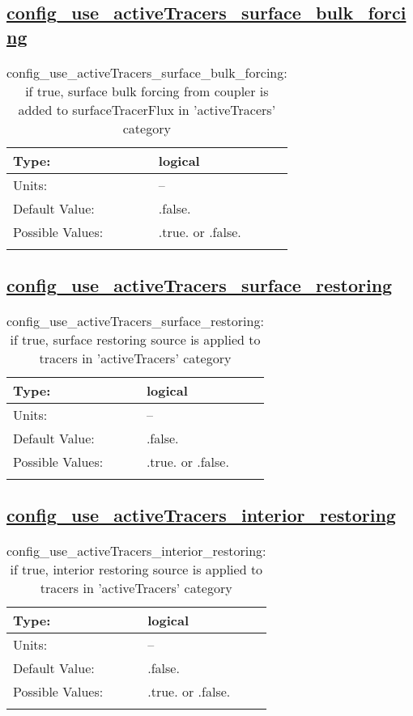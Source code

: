 \subsection[config\_use\_activeTracers\_surface\_bulk\_forcing]{\hyperref[sec:nm_tab_tracer_forcing_activeTracers]{config\_use\_activeTracers\_surface\_bulk\_forcing}}
\label{subsec:nm_sec_config_use_activeTracers_surface_bulk_forcing}
\begin{center}
\begin{longtable}{| p{2.0in} || p{4.0in} |}
    \hline
    Type: & logical \\
    \hline
    Units: & -- \\
    \hline
    Default Value: & .false. \\
    \hline
    Possible Values: & .true. or .false. \\
    \hline
    \caption{config\_use\_activeTracers\_surface\_bulk\_forcing: if true, surface bulk forcing from coupler is added to surfaceTracerFlux in 'activeTracers' category}
\end{longtable}
\end{center}
\subsection[config\_use\_activeTracers\_surface\_restoring]{\hyperref[sec:nm_tab_tracer_forcing_activeTracers]{config\_use\_activeTracers\_surface\_restoring}}
\label{subsec:nm_sec_config_use_activeTracers_surface_restoring}
\begin{center}
\begin{longtable}{| p{2.0in} || p{4.0in} |}
    \hline
    Type: & logical \\
    \hline
    Units: & -- \\
    \hline
    Default Value: & .false. \\
    \hline
    Possible Values: & .true. or .false. \\
    \hline
    \caption{config\_use\_activeTracers\_surface\_restoring: if true, surface restoring source is applied to tracers in 'activeTracers' category}
\end{longtable}
\end{center}
\subsection[config\_use\_activeTracers\_interior\_restoring]{\hyperref[sec:nm_tab_tracer_forcing_activeTracers]{config\_use\_activeTracers\_interior\_restoring}}
\label{subsec:nm_sec_config_use_activeTracers_interior_restoring}
\begin{center}
\begin{longtable}{| p{2.0in} || p{4.0in} |}
    \hline
    Type: & logical \\
    \hline
    Units: & -- \\
    \hline
    Default Value: & .false. \\
    \hline
    Possible Values: & .true. or .false. \\
    \hline
    \caption{config\_use\_activeTracers\_interior\_restoring: if true, interior restoring source is applied to tracers in 'activeTracers' category}
\end{longtable}
\end{center}

